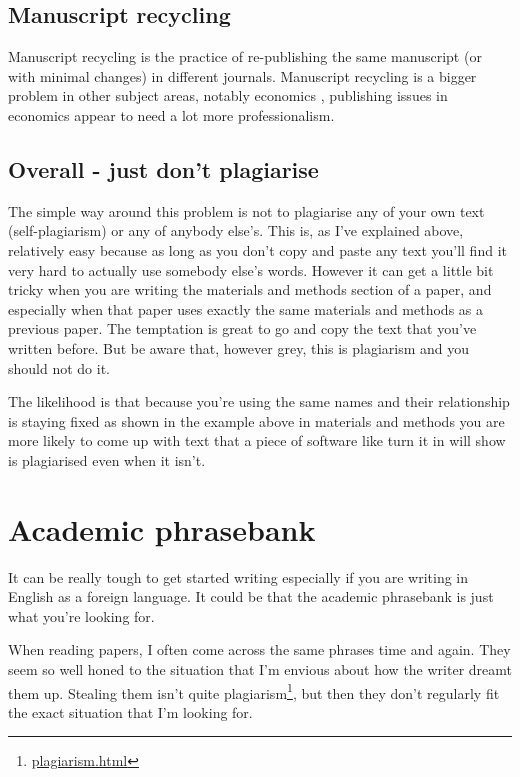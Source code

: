 \documentclass[
]{krantz}
\renewcommand{\href}[2]{#2\footnote{\url{#1}}}
\begin{document}
\hypertarget{manuscript-recycling}{%
\subsection{Manuscript recycling}\label{manuscript-recycling}}

Manuscript recycling is the practice of re-publishing the same manuscript (or with minimal changes) in different journals. Manuscript recycling is a bigger problem in other subject areas, notably economics \citep{geraldi2021self-plagiarism}, publishing issues in economics appear to need a lot more professionalism.

\hypertarget{overall---just-dont-plagiarise}{%
\subsection{Overall - just don't plagiarise}\label{overall---just-dont-plagiarise}}

The simple way around this problem is not to plagiarise any of your own text (self-plagiarism) or any of anybody else's. This is, as I've explained above, relatively easy because as long as you don't copy and paste any text you'll find it very hard to actually use somebody else's words. However it can get a little bit tricky when you are writing the materials and methods section of a paper, and especially when that paper uses exactly the same materials and methods as a previous paper. The temptation is great to go and copy the text that you've written before. But be aware that, however grey, this is plagiarism and you should not do it.

The likelihood is that because you're using the same names and their relationship is staying fixed as shown in the example above in materials and methods you are more likely to come up with text that a piece of software like turn it in will show is plagiarised even when it isn't.

\hypertarget{phrasebank}{%
\section{Academic phrasebank}\label{phrasebank}}

It can be really tough to get started writing especially if you are writing in English as a foreign language. It could be that the academic phrasebank is just what you're looking for.

When reading papers, I often come across the same phrases time and again. They seem so well honed to the situation that I'm envious about how the writer dreamt them up. Stealing them isn't quite \href{plagiarism.html}{plagiarism}, but then they don't regularly fit the exact situation that I'm looking for.
\end{document}
